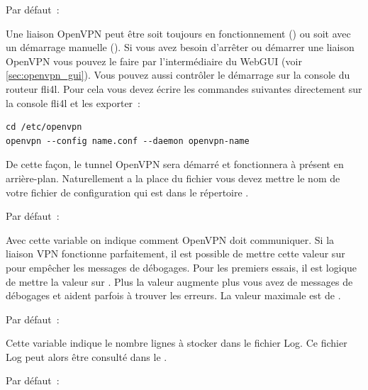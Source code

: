 \begin{description}

  Par défaut~: 

  Une liaison OpenVPN peut être soit toujours en fonctionnement ()
  ou soit avec un démarrage manuelle (). Si vous avez besoin
  d'arrêter ou démarrer une liaison OpenVPN vous pouvez le faire par l'intermédiaire
  du WebGUI (voir \ref{sec:openvpn_gui}). Vous pouvez aussi contrôler le démarrage
  sur la console du routeur fli4l. Pour cela vous devez écrire les commandes
  suivantes directement sur la console fli4l et les exporter~:

\begin{verbatim}
cd /etc/openvpn
openvpn --config name.conf --daemon openvpn-name
\end{verbatim}

  De cette façon, le tunnel OpenVPN sera démarré et fonctionnera à présent en
  arrière-plan. Naturellement a la place du fichier  vous devez
  mettre le nom de votre fichier de configuration qui est dans le répertoire .


  Par défaut~: 

  Avec cette variable on indique comment OpenVPN doit communiquer. Si la liaison
  VPN fonctionne parfaitement, il est possible de mettre cette valeur sur 
  pour empêcher les messages de débogages. Pour les premiers essais, il est logique
  de mettre la valeur sur . Plus la valeur augmente plus vous avez de messages
  de débogages et aident parfois à trouver les erreurs. La valeur maximale est de .


  Par défaut~: 

  Cette variable indique le nombre lignes à stocker dans le fichier Log. Ce fichier
  Log peut alors être consulté dans le .


  Par défaut~: 


\end{description}
